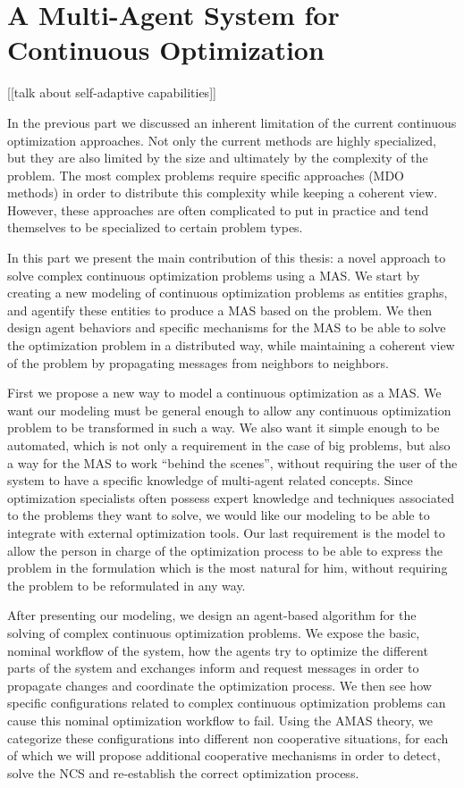 \part{A Multi-Agent System for Continuous Optimization}\label{MAS4Optim_part}

[[talk about self-adaptive capabilities]]

In the previous part we discussed an inherent limitation of the current continuous optimization approaches. Not only the current methods are highly specialized, but they are also limited by the size and ultimately by the complexity of the problem. The most complex problems require specific approaches (MDO methods) in order to distribute this complexity while keeping a coherent view. However, these approaches are often complicated to put in practice and tend themselves to be specialized to certain problem types.

In this part we present the main contribution of this thesis: a novel approach to solve complex continuous optimization problems using a MAS. We start by creating a new modeling of continuous optimization problems as entities graphs, and agentify these entities to produce a MAS based on the problem. We then design agent behaviors and specific mechanisms for the MAS to be able to solve the optimization problem in a distributed way, while maintaining a coherent view of the problem by propagating messages from neighbors to neighbors. 

First we propose a new way to model a continuous optimization as a MAS. We want our modeling must be general enough to allow any continuous optimization problem to be transformed in such a way. We also want it simple enough to be automated, which is not only a requirement in the case of big problems, but also a way for the MAS to work \enquote{behind the scenes}, without requiring the user of the system to have a specific knowledge of multi-agent related concepts. Since optimization specialists often possess expert knowledge and techniques associated to the problems they want to solve, we would like our modeling to be able to integrate with external optimization tools. Our last requirement is the model to allow the person in charge of the optimization process to be able to express the problem in the formulation which is the most natural for him, without requiring the problem to be reformulated in any way.

After presenting our modeling, we design an agent-based algorithm for the solving of complex continuous optimization problems. We expose the basic, nominal workflow of the system, how the agents try to optimize the different parts of the system and exchanges inform and request messages in order to propagate changes and coordinate the optimization process. We then see how specific configurations related to complex continuous optimization problems can cause this nominal optimization workflow to fail. Using the AMAS theory, we categorize these configurations into different non cooperative situations, for each of which we will propose additional cooperative mechanisms in order to detect, solve the NCS and re-establish the correct optimization process.

